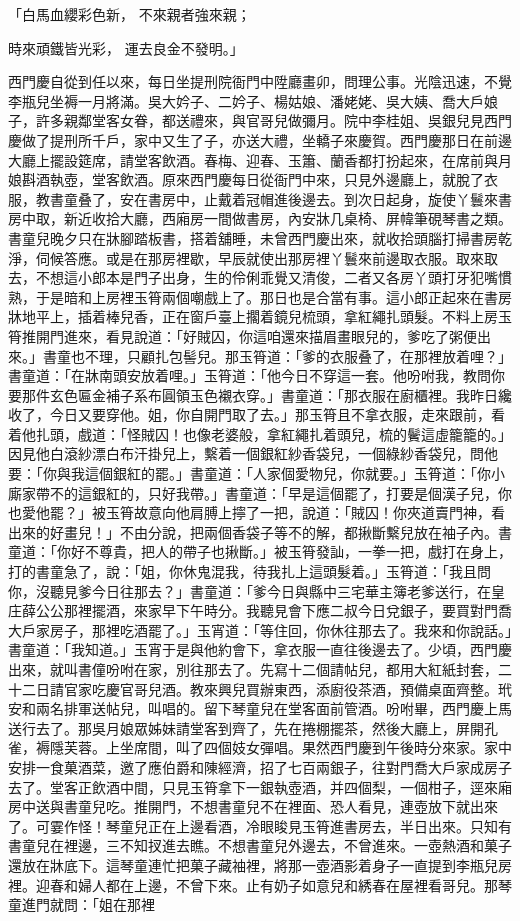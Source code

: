 「白馬血纓彩色新，  不來親者強來親；

時來頑鐵皆光彩，  運去良金不發明。」

西門慶自從到任以來，每日坐提刑院衙門中陞廳畫卯，問理公事。光陰迅速，不覺李瓶兒坐褥一月將滿。吳大妗子、二妗子、楊姑娘、潘姥姥、吳大姨、喬大戶娘子，許多親鄰堂客女眷，都送禮來，與官哥兒做彌月。院中李桂姐、吳銀兒見西門慶做了提刑所千戶，家中又生了子，亦送大禮，坐轎子來慶賀。西門慶那日在前邊大廳上擺設筵席，請堂客飲酒。春梅、迎春、玉簫、蘭香都打扮起來，在席前與月娘斟酒執壺，堂客飲酒。原來西門慶每日從衙門中來，只見外邊廳上，就脫了衣服，教書童叠了，安在書房中，止戴着冠帽進後邊去。到次日起身，旋使丫鬟來書房中取，新近收拾大廳，西廂房一間做書房，內安牀几桌椅、屏幃筆硯琴書之類。書童兒晚夕只在牀腳踏板書，搭着舖睡，未曾西門慶出來，就收拾頭腦打掃書房乾淨，伺候答應。或是在那房裡歇，早辰就使出那房裡丫鬟來前邊取衣服。取來取去，不想這小郎本是門子出身，生的伶俐乖覺又清俊，二者又各房丫頭打牙犯嘴慣熟，于是暗和上房裡玉筲兩個嘲戲上了。那日也是合當有事。這小郎正起來在書房牀地平上，插着棒兒香，正在窗戶臺上擱着鏡兒梳頭，拿紅繩扎頭髮。不料上房玉筲推開門進來，看見說道：「好賊囚，你這咱還來描眉畫眼兒的，爹吃了粥便出來。」書童也不理，只顧扎包髻兒。那玉筲道：「爹的衣服叠了，在那裡放着哩？」書童道：「在牀南頭安放着哩。」玉筲道：「他今日不穿這一套。他吩咐我，教問你要那件玄色匾金補子系布圓領玉色襯衣穿。」書童道：「那衣服在廚櫃裡。我昨日纔收了，今日又要穿他。姐，你自開門取了去。」那玉筲且不拿衣服，走來跟前，看着他扎頭，戲道：「怪賊囚！也像老婆般，拿紅繩扎着頭兒，梳的鬢這虛籠籠的。」因見他白滾紗漂白布汗掛兒上，繫着一個銀紅紗香袋兒，一個綠紗香袋兒，問他要：「你與我這個銀紅的罷。」書童道：「人家個愛物兒，你就要。」玉筲道：「你小廝家帶不的這銀紅的，只好我帶。」書童道：「早是這個罷了，打要是個漢子兒，你也愛他罷？」被玉筲故意向他肩膊上擰了一把，說道：「賊囚！你夾道賣門神，看出來的好畫兒！」不由分說，把兩個香袋子等不的解，都揪斷繫兒放在袖子內。書童道：「你好不尊貴，把人的帶子也揪斷。」被玉筲發訕，一拳一把，戲打在身上，打的書童急了，說：「姐，你休鬼混我，待我扎上這頭髮着。」玉筲道：「我且問你，沒聽見爹今日往那去？」書童道：「爹今日與縣中三宅華主簿老爹送行，在皇庄薛公公那裡擺酒，來家早下午時分。我聽見會下應二叔今日兌銀子，要買對門喬大戶家房子，那裡吃酒罷了。」玉宵道：「等住回，你休往那去了。我來和你說話。」書童道：「我知道。」玉宵于是與他約會下，拿衣服一直往後邊去了。少頃，西門慶出來，就叫書僮吩咐在家，別往那去了。先寫十二個請帖兒，都用大紅紙封套，二十二日請官家吃慶官哥兒酒。教來興兒買辦東西，添廚役茶酒，預備桌面齊整。玳安和兩名排軍送帖兒，叫唱的。留下琴童兒在堂客面前管酒。吩咐畢，西門慶上馬送行去了。那吳月娘眾姊妹請堂客到齊了，先在捲棚擺茶，然後大廳上，屏開孔雀，褥隱芙蓉。上坐席間，叫了四個妓女彈唱。果然西門慶到午後時分來家。家中安排一食菓酒菜，邀了應伯爵和陳經濟，招了七百兩銀子，往對門喬大戶家成房子去了。堂客正飲酒中間，只見玉筲拿下一銀執壺酒，并四個梨，一個柑子，逕來廂房中送與書童兒吃。推開門，不想書童兒不在裡面、恐人看見，連壺放下就出來了。可霎作怪！琴童兒正在上邊看酒，冷眼睃見玉筲進書房去，半日出來。只知有書童兒在裡邊，三不知扠進去瞧。不想書童兒外邊去，不曾進來。一壺熱酒和菓子還放在牀底下。這琴童連忙把菓子藏袖裡，將那一壺酒影着身子一直提到李瓶兒房裡。迎春和婦人都在上邊，不曾下來。止有奶子如意兒和綉春在屋裡看哥兒。那琴童進門就問：「姐在那裡